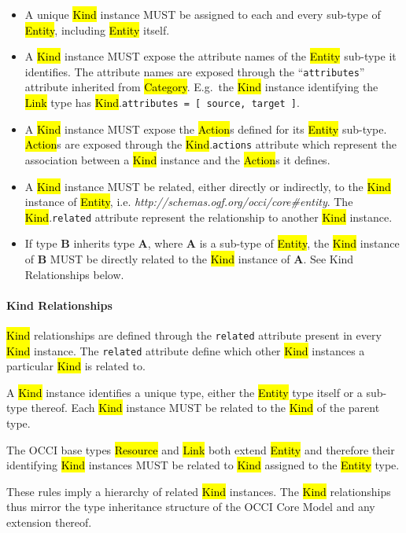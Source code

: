 \documentclass[10pt,a4paper]{article}
\begin{document}
\begin{itemize}
  \item A unique \hl{Kind} instance MUST be assigned to each and every
    sub-type of \hl{Entity}, including \hl{Entity} itself.
  \item A \hl{Kind} instance MUST expose the attribute names of the
    \hl{Entity} sub-type it identifies. The attribute names are
    exposed through the ``{\tt attributes}'' attribute inherited from
    \hl{Category}. E.g.~the \hl{Kind} instance identifying the
    \hl{Link} type has \hl{Kind}.{\tt attributes = [ source, target
    ]}.
  \item A \hl{Kind} instance MUST expose the \hl{Action}s defined for
    its \hl{Entity} sub-type. \hl{Action}s are exposed through the
    \hl{Kind}.{\tt actions} attribute which represent the association
    between a \hl{Kind} instance and the \hl{Action}s it defines.
  \item A \hl{Kind} instance MUST be related, either directly or
    indirectly, to the \hl{Kind} instance of \hl{Entity},
    i.e. \textit{http://schemas.ogf.org/occi/core\#entity}.  The
    \hl{Kind}.{\tt related} attribute represent the relationship to
    another \hl{Kind} instance.
  \item If type {\bf B} inherits type {\bf A}, where {\bf A} is a
    sub-type of \hl{Entity}, the \hl{Kind} instance of {\bf B} MUST be
    directly related to the \hl{Kind} instance of {\bf A}. See Kind
    Relationships below.
\end{itemize}

\paragraph*{Kind Relationships}
\hl{Kind} relationships are defined through the {\tt related}
attribute present in every \hl{Kind} instance. The {\tt related}
attribute define which other \hl{Kind} instances a particular
\hl{Kind} is related to.

A \hl{Kind} instance identifies a unique type, either the \hl{Entity}
type itself or a sub-type thereof.  Each \hl{Kind} instance MUST be
related to the \hl{Kind} of the parent type.

The OCCI base types \hl{Resource} and \hl{Link} both extend
\hl{Entity} and therefore their identifying \hl{Kind} instances MUST
be related to \hl{Kind} assigned to the \hl{Entity} type.

These rules imply a hierarchy of related \hl{Kind} instances. The
\hl{Kind} relationships thus mirror the type inheritance structure of
the OCCI Core Model and any extension thereof.
\end{document}

